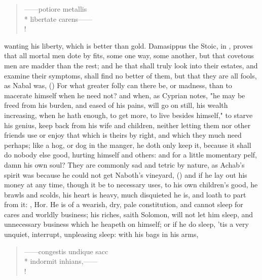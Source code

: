 \begin{latin}
\begin{verse}%
------potiore metallis\\*
libertate carens------\\!
\end{verse}%
\end{latin}
wanting his liberty, which is better than gold. Damasippus the Stoic, in
\Horace{}, proves that all mortal men dote by fits, some one way, some another,
but that covetous men are madder than the rest; and he
that shall truly look into their estates, and examine their symptoms, shall
find no better of them, but that they are all fools, as
Nabal was,  () For what greater folly can
there be, or madness, than to macerate himself when he
need not? and when, as Cyprian notes, "he may be freed
from his burden, and eased of his pains, will go on still, his wealth
increasing, when he hath enough, to get more, to live besides himself," to
starve his genius, keep back from his wife and children,
neither letting them nor other friends use or enjoy that which is theirs by
right, and which they much need perhaps; like a hog, or dog in the manger, he
doth only keep it, because it shall do nobody else good, hurting himself and
others: and for a little momentary pelf, damn his own soul? They are commonly
sad and tetric by nature, as Achab's spirit was because he could not get
Naboth's vineyard, () and if he lay out his money at any
time, though it be to necessary uses, to his own children's good, he brawls and
scolds, his heart is heavy, much disquieted he is, and loath to part from it:
, Hor. He is of a wearish, dry, pale
constitution, and cannot sleep for cares and worldly business; his riches,
saith Solomon, will not let him sleep, and unnecessary business which he
heapeth on himself; or if he do sleep, 'tis a very unquiet, interrupt,
unpleasing sleep: with his bags in his arms,

\begin{latin}
\begin{verse}%
------congestis undique sacc\\*
indormit inhians,------\\!
\end{verse}%
\end{latin}

